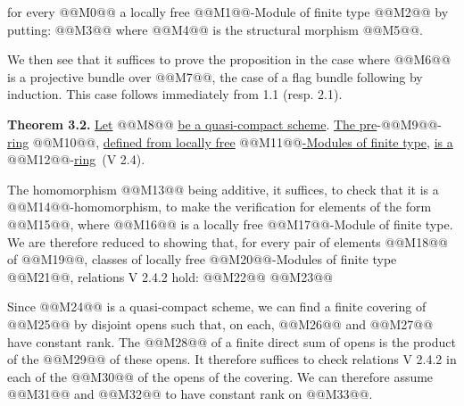 for every @@M0@@ a locally free @@M1@@-Module of finite type @@M2@@ by putting:
@@M3@@
where @@M4@@ is the structural morphism @@M5@@.

We then see that it suffices to prove the proposition in the case where @@M6@@ is a projective bundle over @@M7@@, the case of a flag bundle following by induction. This case follows immediately from 1.1 (resp. 2.1).

\textbf{Theorem 3.2.} \uline{Let} @@M8@@ \uline{be a quasi-compact scheme}. \uline{The pre}-@@M9@@-\uline{ring} @@M10@@, \uline{defined from locally free} @@M11@@\uline{-Modules of finite type}, \uline{is a} @@M12@@-\uline{ring}~(V 2.4).

The homomorphism @@M13@@ being additive, it suffices, to check that it is a @@M14@@-homomorphism, to make the verification for elements of the form @@M15@@, where @@M16@@ is a locally free @@M17@@-Module of finite type. We are therefore reduced to showing that, for every pair of elements @@M18@@ of @@M19@@, classes of locally free @@M20@@-Modules of finite type @@M21@@, relations V 2.4.2 hold:
@@M22@@
@@M23@@

Since @@M24@@ is a quasi-compact scheme, we can find a finite covering of @@M25@@ by disjoint opens such that, on each, @@M26@@ and @@M27@@ have constant rank. The @@M28@@ of a finite direct sum of opens is the product of the @@M29@@ of these opens. It therefore suffices to check relations V 2.4.2 in each of the @@M30@@ of the opens of the covering. We can therefore assume @@M31@@ and @@M32@@ to have constant rank on @@M33@@.

